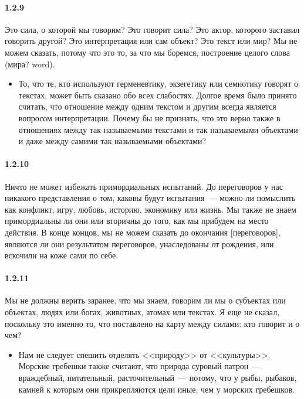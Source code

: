 \paragraph{1.2.9}\hypertarget{par:1.2.9}{} Это сила, о которой мы говорим? Это говорит сила? Это актор, которого заставил говорить другой? Это интерпретация или сам объект? Это текст или мир? Мы не можем сказать, потому что это то, за что мы боремся, построение целого слова (мира? word).
	\begin{itemize}
	\item То, что те, кто используют герменевтику, экзегетику или семиотику говорят о текстах, может быть сказано обо всех слабостях. Долгое время было принято считать, что отношение между одним текстом и другим всегда является вопросом интерпретации. Почему бы не признать, что это верно также в отношениях между так называемыми текстами и так называемыми объектами и даже между самими так называемыми объектами?
	\end{itemize}

\paragraph{1.2.10}\hypertarget{par:1.2.10}{} Ничто не может избежать примордиальных испытаний. До переговоров у нас никакого представления о том, каковы будут испытания~--- можно ли помыслить как конфликт, игру, любовь, историю, экономику или жизнь. Мы также не знаем примордиальны ли они или вторичны до того, как мы прибудем на место действия. В конце концов, мы не можем сказать до окончания [переговоров], являются ли они результатом переговоров, унаследованы от рождения, или вскочили на коже сами по себе.

\paragraph{1.2.11}\hypertarget{par:1.2.11}{} Мы не должны верить заранее, что мы знаем, говорим ли мы о субъектах или объектах, людях или богах, животных, атомах или текстах. Я еще не сказал, поскольку это именно то, что поставлено на карту между силами: кто говорит и о чем?
	\begin{itemize}
	\item Нам не следует спешить отделять <<природу>> от <<культуры>>. Морские гребешки также считают, что природа суровый патрон~--- враждебный, питательный, расточительный~--- потому, что у рыбы, рыбаков, камней к которым они прикрепляются цели иные, чем у морских гребешков.
	\end{itemize}

